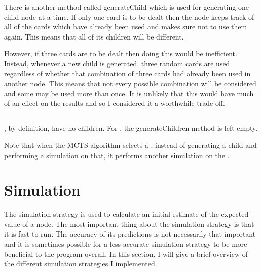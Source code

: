 There is another method called generateChild which is used for generating one child node at a time. If only one card is to be dealt then the node keeps track of all of the cards which have already been used and makes sure not to use them again. This means that all of its children will be different. 

However, if three cards are to be dealt then doing this would be inefficient. Instead, whenever a new child is generated, three random cards are used regardless of whether that combination of three cards had already been used in another node. This means that not every possible combination will be considered and some may be used more than once. It is unlikely that this would have much of an effect on the results and so I considered it a worthwhile trade off. 


\subsection{\leaf}									%

\leafs, by definition, have no children. For \leafs, the generateChildren method is left empty.

Note that when the MCTS algorithm selects a \leaf, instead of generating a child and performing a simulation on that, it performs another simulation on the \leaf.



\section{Simulation}							%



The simulation strategy is used to calculate an initial estimate of the expected value of a node. The most important thing about the simulation strategy is that it is fast to run. The accuracy of its predictions is not necessarily that important and it is sometimes possible for a less accurate simulation strategy to be more beneficial to the program overall.
In this section, I will give a brief overview of the different simulation strategies I implemented.



